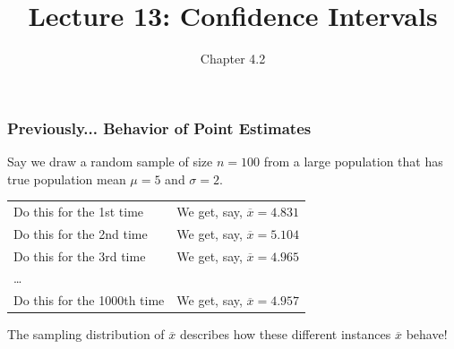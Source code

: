 \documentclass[handout]{beamer}
\title{Lecture 13: Confidence Intervals}
\author{Chapter 4.2}
\newcommand{\blue}[1]{\textcolor{blue2}{#1}}
\newcommand{\xbar}{\overline{x}}
\begin{document}
\begin{frame}
\titlepage
\end{frame}


\begin{frame}[fragile]
\frametitle{Previously... Behavior of Point Estimates}
Say we draw a random sample of size $n=100$ from a large population that has true population mean $\mu=5$ and $\sigma=2$.

\vskip 0.5cm

\begin{center}
\begin{tabular}{ll}
Do this for the 1st time & We get, say, $\overline{x}=4.831$\\
Do this for the 2nd time & We get, say, $\overline{x}=5.104$\\
Do this for the 3rd time & We get, say, $\overline{x}=4.965$\\
\ldots & \\
Do this for the 1000th time & We get, say, $\overline{x}=4.957$
\end{tabular}
\end{center}

\vskip 0.5cm

The \blue{sampling distribution of $\xbar$} describes how these different instances $\xbar$ behave!

\end{frame}
\end{document}
